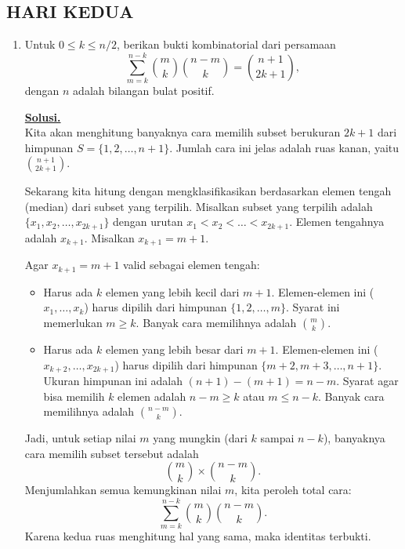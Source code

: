 \documentclass[12pt,twoside]{article}
\newenvironment{solution}
{
	\par\noindent\textbf{\underline{Solusi.}}\\
}
{
	\par
}
\begin{document}
\subsection{HARI KEDUA}
\begin{enumerate}
  \item Untuk $0\leq k\leq n/2$, berikan bukti kombinatorial dari persamaan
        $$\sum_{m=k}^{n-k}\binom{m}{k}\binom{n-m}{k}=\binom{n+1}{2k+1},$$
        dengan $n$ adalah bilangan bulat positif.
        \begin{solution}
          Kita akan menghitung banyaknya cara memilih subset berukuran $2k+1$ dari himpunan $S = \{1, 2, \dots, n+1\}$. Jumlah cara ini jelas adalah ruas kanan, yaitu $\binom{n+1}{2k+1}$.

          Sekarang kita hitung dengan mengklasifikasikan berdasarkan elemen tengah (median) dari subset yang terpilih.
          Misalkan subset yang terpilih adalah $\{x_1, x_2, \dots, x_{2k+1}\}$ dengan urutan $x_1 < x_2 < \dots < x_{2k+1}$.
          Elemen tengahnya adalah $x_{k+1}$. Misalkan $x_{k+1} = m+1$.

          Agar $x_{k+1} = m+1$ valid sebagai elemen tengah:
          \begin{itemize}
            \item Harus ada $k$ elemen yang lebih kecil dari $m+1$. Elemen-elemen ini ($x_1, \dots, x_k$) harus dipilih dari himpunan $\{1, 2, \dots, m\}$. Syarat ini memerlukan $m \ge k$. Banyak cara memilihnya adalah $\binom{m}{k}$.
            \item Harus ada $k$ elemen yang lebih besar dari $m+1$. Elemen-elemen ini ($x_{k+2}, \dots, x_{2k+1}$) harus dipilih dari himpunan $\{m+2, m+3, \dots, n+1\}$. Ukuran himpunan ini adalah $(n+1)-(m+1) = n-m$. Syarat agar bisa memilih $k$ elemen adalah $n-m \ge k$ atau $m \le n-k$. Banyak cara memilihnya adalah $\binom{n-m}{k}$.
          \end{itemize}
          Jadi, untuk setiap nilai $m$ yang mungkin (dari $k$ sampai $n-k$), banyaknya cara memilih subset tersebut adalah
          \[ \binom{m}{k} \times \binom{n-m}{k}. \]
          Menjumlahkan semua kemungkinan nilai $m$, kita peroleh total cara:
          \[ \sum_{m=k}^{n-k} \binom{m}{k} \binom{n-m}{k}. \]
          Karena kedua ruas menghitung hal yang sama, maka identitas terbukti.
        \end{solution}


\end{enumerate}
\end{document}
